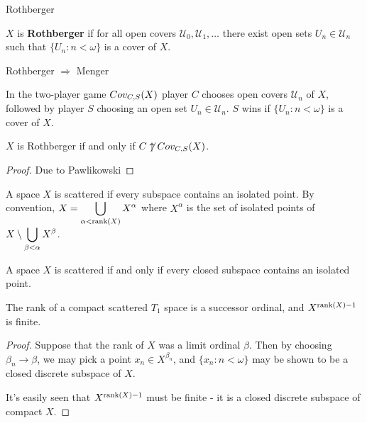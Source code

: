 \newpage

  \centerline{Rothberger}

  \begin{definition}
    $X$ is \textbf{Rothberger} if for all open covers $\mathcal{U}_0,\mathcal{U}_1,\dots$ there exist open sets $U_n\in \mathcal{U}_n$ such that $\{U_n:n<\omega\}$ is a cover of $X$.
  \end{definition}

  \begin{proposition}
    Rothberger $\Rightarrow$ Menger
  \end{proposition}

  \begin{definition}
    In the two-player game $Cov_{C,S}(X)$ player $C$ chooses open covers $\mathcal{U}_n$ of $X$, followed by player $S$ choosing an open set $U_n\in\mathcal{U}_n$. $S$ wins if $\{U_n:n<\omega\}$ is a cover of $X$.
  \end{definition}

  \begin{theorem}
    $X$ is Rothberger if and only if $C\not\uparrow Cov_{C,S}(X)$.
  \end{theorem}

  \begin{proof}
    Due to Pawlikowski
  \end{proof}

  \begin{definition}
    A space $X$ is scattered if every subspace contains an isolated point. By convention, $\displaystyle X = \bigcup_{\alpha<\textrm{rank}(X)}X^\alpha$ where $X^\alpha$ is the set of isolated points of $\displaystyle X\setminus\bigcup_{\beta<\alpha}X^\beta$.
  \end{definition}

  \begin{proposition}
    A space $X$ is scattered if and only if every closed subspace contains an isolated point.
  \end{proposition}

  \begin{proposition}
    The rank of a compact scattered $T_1$ space is a successor ordinal, and $X^{\textrm{rank}(X)-1}$ is finite.
  \end{proposition}

  \begin{proof}
    Suppose that the rank of $X$ was a limit ordinal $\beta$. Then by choosing $\beta_n\to\beta$, we may pick a point $x_n\in X^{\beta_n}$, and $\{x_n: n<\omega\}$ may be shown to be a closed discrete subspace of $X$.

    It's easily seen that $X^{\textrm{rank}(X)-1}$ must be finite - it is a closed discrete subspace of compact $X$.
  \end{proof}

